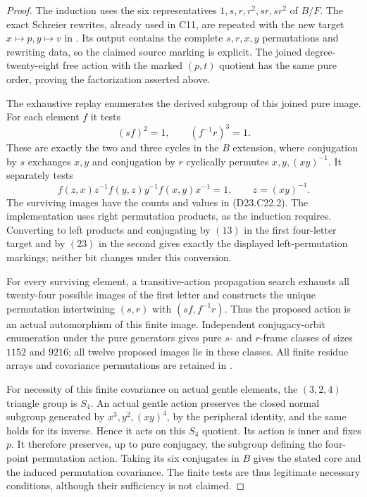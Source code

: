 \begin{proof}
The induction uses the six representatives
$1,s,r,r^2,sr,sr^2$ of $B/F$. The exact Schreier rewrites,
already used in C11, are repeated with the new target
$x\mapsto p,y\mapsto v$ in
.
Its output contains the complete $s,r,x,y$ permutations and
rewriting data, so the claimed source marking is explicit.
The joined degree-twenty-eight free action with the marked
$(p,t)$ quotient has the same pure order, proving the
factorization asserted above.

The exhaustive replay
enumerates the derived subgroup of this joined pure image.
For each element $f$ it tests
\[
                         (sf)^2=1,\qquad(f^{-1}r)^3=1.
\]
These are exactly the two and three cycles in the $B$
extension, where conjugation by $s$ exchanges $x,y$ and
conjugation by $r$ cyclically permutes $x,y,(xy)^{-1}$.
It separately tests
\[
 f(z,x)z^{-1}f(y,z)y^{-1}f(x,y)x^{-1}=1,
 \qquad z=(xy)^{-1}.
\]
The surviving images have the counts and values in
(D23.C22.2). The implementation uses right permutation
products, as the induction requires. Converting to left
products and conjugating by $(13)$ in the first four-letter
target and by $(23)$ in the second gives exactly the displayed
left-permutation markings; neither bit changes under this
conversion.

For every surviving element, a transitive-action propagation
search exhausts all twenty-four possible images of the first
letter and constructs the unique permutation intertwining
$(s,r)$ with $(sf,f^{-1}r)$. Thus the proposed action is an
actual automorphism of this finite image. Independent
conjugacy-orbit enumeration under the pure generators gives
pure $s$- and $r$-frame classes of sizes $1152$ and $9216$;
all twelve proposed images lie in these classes.
All finite residue arrays and covariance permutations are
retained in
.

For necessity of this finite covariance on actual gentle
elements, the $(3,2,4)$ triangle group is $S_4$.
An actual gentle action preserves the closed normal subgroup
generated by $x^3,y^2,(xy)^4$, by the peripheral identity,
and the same holds for its inverse. Hence it acts on this
$S_4$ quotient. Its action is inner and fixes $p$.
It therefore preserves, up to pure conjugacy, the subgroup
defining the four-point permutation action. Taking its six
conjugates in $B$ gives the stated core and the induced
permutation covariance. The finite tests are thus legitimate
necessary conditions, although their sufficiency is not claimed.


\end{proof}
